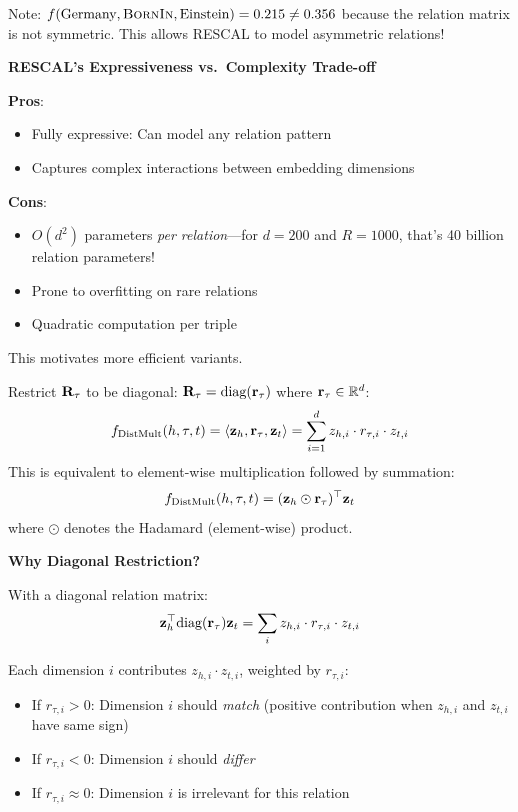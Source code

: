 \begin{notechapter}
\begin{example}
Note: $f(\text{Germany}, \textsc{BornIn}, \text{Einstein}) = 0.215 \neq 0.356$ because the relation matrix is not symmetric. This allows RESCAL to model asymmetric relations!
\end{example}

\begin{keyinsight}
\textbf{RESCAL's Expressiveness vs.\ Complexity Trade-off}

\textbf{Pros}:
\begin{itemize}
    \item Fully expressive: Can model any relation pattern
    \item Captures complex interactions between embedding dimensions
\end{itemize}

\textbf{Cons}:
\begin{itemize}
    \item $O(d^2)$ parameters \emph{per relation}---for $d = 200$ and $R = 1000$, that's 40 billion relation parameters!
    \item Prone to overfitting on rare relations
    \item Quadratic computation per triple
\end{itemize}

This motivates more efficient variants.
\end{keyinsight}

\begin{definition}
Restrict $\mathbf{R}_\tau$ to be diagonal: $\mathbf{R}_\tau = \text{diag}(\mathbf{r}_\tau)$ where $\mathbf{r}_\tau \in \mathbb{R}^d$:
\begin{equation}
f_{\text{DistMult}}(h, \tau, t) = \langle \mathbf{z}_h, \mathbf{r}_\tau, \mathbf{z}_t \rangle = \sum_{i=1}^{d} z_{h,i} \cdot r_{\tau,i} \cdot z_{t,i}
\end{equation}
This is equivalent to element-wise multiplication followed by summation:
\[
f_{\text{DistMult}}(h, \tau, t) = (\mathbf{z}_h \odot \mathbf{r}_\tau)^\top \mathbf{z}_t
\]
where $\odot$ denotes the Hadamard (element-wise) product.
\end{definition}

\begin{mathbox}
\textbf{Why Diagonal Restriction?}

With a diagonal relation matrix:
\[
\mathbf{z}_h^\top \text{diag}(\mathbf{r}_\tau) \mathbf{z}_t = \sum_i z_{h,i} \cdot r_{\tau,i} \cdot z_{t,i}
\]

Each dimension $i$ contributes $z_{h,i} \cdot z_{t,i}$, weighted by $r_{\tau,i}$:
\begin{itemize}
    \item If $r_{\tau,i} > 0$: Dimension $i$ should \emph{match} (positive contribution when $z_{h,i}$ and $z_{t,i}$ have same sign)
    \item If $r_{\tau,i} < 0$: Dimension $i$ should \emph{differ}
    \item If $r_{\tau,i} \approx 0$: Dimension $i$ is irrelevant for this relation
\end{itemize}


\end{mathbox}
\end{notechapter}
